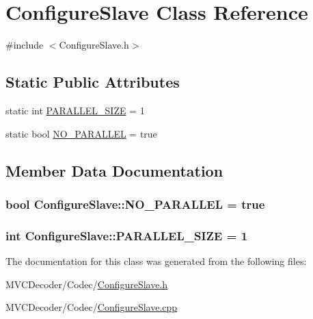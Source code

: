 \hypertarget{class_configure_slave}{
\section{ConfigureSlave Class Reference}
\label{class_configure_slave}
}


{\ttfamily \#include $<$ConfigureSlave.h$>$}

\subsection*{Static Public Attributes}
\begin{DoxyCompactItemize}
\item 
static int \hyperlink{class_configure_slave_aa79549b1785cff1588646653021641f2}{PARALLEL\_\-SIZE} = 1
\item 
static bool \hyperlink{class_configure_slave_a51c09eff937ca8da9bcc20e1367ddb3d}{NO\_\-PARALLEL} = true
\end{DoxyCompactItemize}


\subsection{Member Data Documentation}
\hypertarget{class_configure_slave_a51c09eff937ca8da9bcc20e1367ddb3d}{
\subsubsection[{NO\_\-PARALLEL}]{\setlength{\rightskip}{0pt plus 5cm}bool {\bf ConfigureSlave::NO\_\-PARALLEL} = true}}
\label{class_configure_slave_a51c09eff937ca8da9bcc20e1367ddb3d}
\hypertarget{class_configure_slave_aa79549b1785cff1588646653021641f2}{
\subsubsection[{PARALLEL\_\-SIZE}]{\setlength{\rightskip}{0pt plus 5cm}int {\bf ConfigureSlave::PARALLEL\_\-SIZE} = 1}}
\label{class_configure_slave_aa79549b1785cff1588646653021641f2}


The documentation for this class was generated from the following files:\begin{DoxyCompactItemize}
\item 
MVCDecoder/Codec/\hyperlink{_configure_slave_8h}{ConfigureSlave.h}\item 
MVCDecoder/Codec/\hyperlink{_configure_slave_8cpp}{ConfigureSlave.cpp}\end{DoxyCompactItemize}
